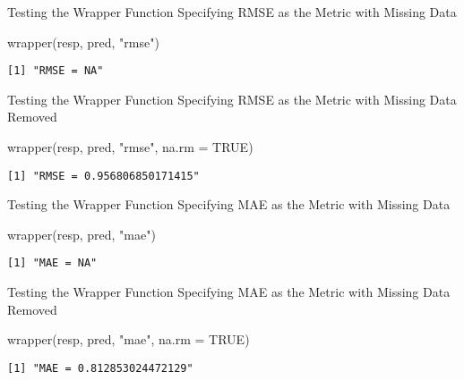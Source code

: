 \documentclass[
  letterpaper,
  DIV=11,
  numbers=noendperiod]{scrartcl}
\newenvironment{Shaded}{\begin{snugshade}}{\end{snugshade}}
\newcommand{\AttributeTok}[1]{\textcolor[rgb]{0.40,0.45,0.13}{#1}}
\newcommand{\ConstantTok}[1]{\textcolor[rgb]{0.56,0.35,0.01}{#1}}
\newcommand{\FunctionTok}[1]{\textcolor[rgb]{0.28,0.35,0.67}{#1}}
\newcommand{\NormalTok}[1]{\textcolor[rgb]{0.00,0.23,0.31}{#1}}
\newcommand{\StringTok}[1]{\textcolor[rgb]{0.13,0.47,0.30}{#1}}
\begin{document}
Testing the Wrapper Function Specifying RMSE as the Metric with Missing
Data

\begin{Shaded}
\begin{Highlighting}[]
\FunctionTok{wrapper}\NormalTok{(resp, pred, }\StringTok{"rmse"}\NormalTok{)}
\end{Highlighting}
\end{Shaded}

\begin{verbatim}
[1] "RMSE = NA"
\end{verbatim}

Testing the Wrapper Function Specifying RMSE as the Metric with Missing
Data Removed

\begin{Shaded}
\begin{Highlighting}[]
\FunctionTok{wrapper}\NormalTok{(resp, pred, }\StringTok{"rmse"}\NormalTok{, }\AttributeTok{na.rm =} \ConstantTok{TRUE}\NormalTok{)}
\end{Highlighting}
\end{Shaded}

\begin{verbatim}
[1] "RMSE = 0.956806850171415"
\end{verbatim}

Testing the Wrapper Function Specifying MAE as the Metric with Missing
Data

\begin{Shaded}
\begin{Highlighting}[]
\FunctionTok{wrapper}\NormalTok{(resp, pred, }\StringTok{"mae"}\NormalTok{)}
\end{Highlighting}
\end{Shaded}

\begin{verbatim}
[1] "MAE = NA"
\end{verbatim}

Testing the Wrapper Function Specifying MAE as the Metric with Missing
Data Removed

\begin{Shaded}
\begin{Highlighting}[]
\FunctionTok{wrapper}\NormalTok{(resp, pred, }\StringTok{"mae"}\NormalTok{, }\AttributeTok{na.rm =} \ConstantTok{TRUE}\NormalTok{)}
\end{Highlighting}
\end{Shaded}

\begin{verbatim}
[1] "MAE = 0.812853024472129"
\end{verbatim}
\end{document}
